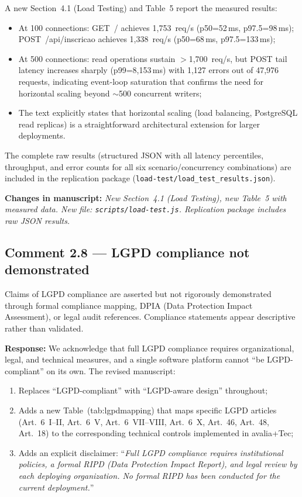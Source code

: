 \documentclass[11pt,a4paper]{article}
\newcommand{\response}[1]{\par\noindent\textcolor{responsecolor}{\textbf{Response:}} #1}
\newcommand{\change}[1]{\par\noindent\textcolor{changecolor}{\textbf{Changes in manuscript:}} \textit{#1}}
\begin{document}
A new Section~4.1 (Load Testing) and Table~5 report the measured results:
\begin{itemize}[nosep]
  \item At 100 connections: GET~/ achieves 1,753~req/s (p50=52\,ms, p97.5=98\,ms); POST~/api/inscricao achieves 1,338~req/s (p50=68\,ms, p97.5=133\,ms);
  \item At 500 connections: read operations sustain $>$1,700~req/s, but POST tail latency increases sharply (p99=8,153\,ms) with 1,127 errors out of 47,976 requests, indicating event-loop saturation that confirms the need for horizontal scaling beyond $\sim$500 concurrent writers;
  \item The text explicitly states that horizontal scaling (load balancing, PostgreSQL read replicas) is a straightforward architectural extension for larger deployments.
\end{itemize}

The complete raw results (structured JSON with all latency percentiles, throughput, and error counts for all six scenario/concurrency combinations) are included in the replication package (\texttt{load-test/load\_test\_results.json}).

\change{New Section~4.1 (Load Testing), new Table~5 with measured data. New file: \texttt{scripts/load-test.js}. Replication package includes raw JSON results.}

\bigskip

\subsection*{Comment 2.8 --- LGPD compliance not demonstrated}

\begin{reviewerbox}
Claims of LGPD compliance are asserted but not rigorously demonstrated through formal compliance mapping, DPIA (Data Protection Impact Assessment), or legal audit references. Compliance statements appear descriptive rather than validated.
\end{reviewerbox}

\response{We acknowledge that full LGPD compliance requires organizational, legal, and technical measures, and a single software platform cannot ``be LGPD-compliant'' on its own. The revised manuscript:}

\begin{enumerate}[nosep]
  \item Replaces ``LGPD-compliant'' with ``LGPD-aware design'' throughout;
  \item Adds a new Table~(tab:lgpdmapping) that maps specific LGPD articles (Art.~6~I--II, Art.~6~V, Art.~6~VII--VIII, Art.~6~X, Art.~46, Art.~48, Art.~18) to the corresponding technical controls implemented in avalia+Tec;
  \item Adds an explicit disclaimer: ``\textit{Full LGPD compliance requires institutional policies, a formal RIPD (Data Protection Impact Report), and legal review by each deploying organization. No formal RIPD has been conducted for the current deployment.}''
\end{enumerate}
\end{document}
